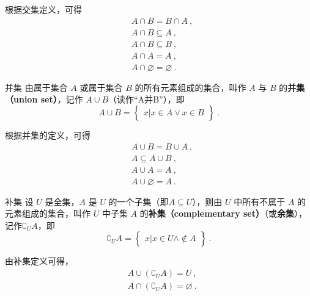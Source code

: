 根据交集定义，可得
\begin{equation}
\begin{aligned}
&A\cap B = B\cap A~, \\ 
&A\cap B \subseteq A ~,\\
&A\cap B \subseteq B~, \\
&A\cap A = A ~,\\
&A\cap \varnothing = \varnothing~.
\end{aligned}
\end{equation}

\begin{definition}{并集}
由属于集合 $A$ 或属于集合 $B$ 的所有元素组成的集合，叫作 $A$ 与 $B$ 的\textbf{并集（union set）}，记作 $A\cup B$（读作“A并B”），即
\begin{equation}
A\cup B = \begin{Bmatrix}x|x\in A \vee x\in B\end{Bmatrix}~.
\end{equation}
\end{definition}

根据并集的定义，可得
\begin{equation}
\begin{aligned}
&A\cup B = B\cup A~, \\
&A\subseteq A\cup B ~,\\
&A\cup A = A ~,\\
&A\cup \varnothing = A~.
\end{aligned}
\end{equation}



\begin{definition}{补集}
设 $U$ 是全集，$A$ 是 $U$ 的一个子集（即$A\subseteq U$），则由 $U$ 中所有不属于 $A$ 的元素组成的集合，叫作 $U$ 中子集 $A$ 的\textbf{补集（complementary set）}（或\textbf{余集}），记作$\complement_UA$，即
\begin{equation}
\complement_UA = \begin{Bmatrix}x|x\in U \wedge \notin A\end{Bmatrix}~.
\end{equation}
\end{definition}

由补集定义可得，
\begin{equation}
\begin{aligned}
&A\cup (\complement_UA) = U~, \\
&A\cap (\complement_UA) = \varnothing~.
\end{aligned}
\end{equation}
